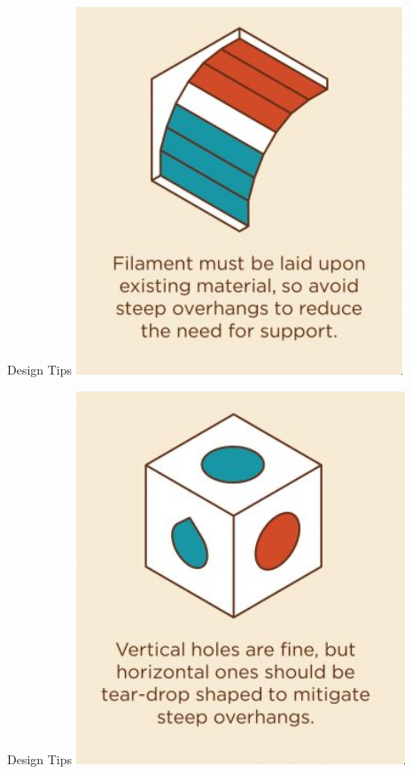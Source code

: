 \documentclass{presentation}
\begin{document}
\begin{frame}{Design Tips}
  \centering
  \includegraphics[width=\textwidth/2]{./overhang.jpg}
\end{frame}

\begin{frame}{Design Tips}
  \centering
  \includegraphics[width=\textwidth/2]{./holes.jpg}
\end{frame}
\end{document}
